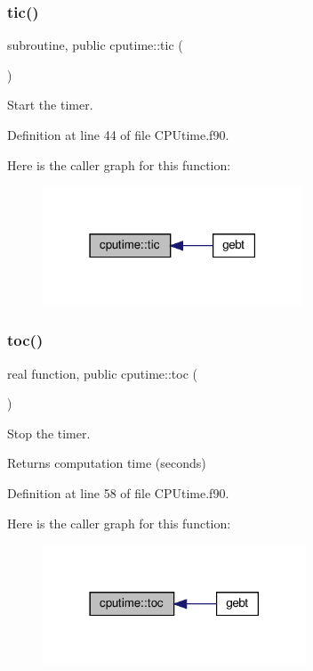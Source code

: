 \subsubsection{\texorpdfstring{tic()}{tic()}}
{\footnotesize\ttfamily subroutine, public cputime\+::tic (\begin{DoxyParamCaption}{ }\end{DoxyParamCaption})}



Start the timer. 



Definition at line 44 of file C\+P\+Utime.\+f90.

Here is the caller graph for this function\+:\nopagebreak
\begin{figure}[H]
\begin{center}
\leavevmode
\includegraphics[width=219pt]{namespacecputime_a8ddcbcba17e66ece6b29c63b69753684_icgraph}
\end{center}
\end{figure}
\mbox{\label{namespacecputime_a6c69d406a4397d16ea918e4eb035fde9}} 
\subsubsection{\texorpdfstring{toc()}{toc()}}
{\footnotesize\ttfamily real function, public cputime\+::toc (\begin{DoxyParamCaption}{ }\end{DoxyParamCaption})}



Stop the timer. 

\begin{DoxyReturn}{Returns}
computation time (seconds) 
\end{DoxyReturn}


Definition at line 58 of file C\+P\+Utime.\+f90.

Here is the caller graph for this function\+:\nopagebreak
\begin{figure}[H]
\begin{center}
\leavevmode
\includegraphics[width=222pt]{namespacecputime_a6c69d406a4397d16ea918e4eb035fde9_icgraph}
\end{center}
\end{figure}


